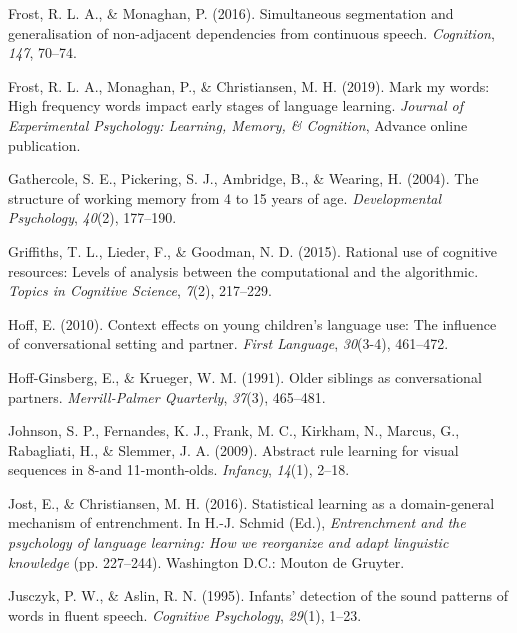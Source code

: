 \documentclass[
  english,
  man,mask,floatsintext]{apa6}
\begin{document}
\leavevmode\hypertarget{ref-frost2016simultaneous}{}%
Frost, R. L. A., \& Monaghan, P. (2016). Simultaneous segmentation and generalisation of non-adjacent dependencies from continuous speech. \emph{Cognition}, \emph{147}, 70--74.

\leavevmode\hypertarget{ref-frost2019}{}%
Frost, R. L. A., Monaghan, P., \& Christiansen, M. H. (2019). Mark my words: High frequency words impact early stages of language learning. \emph{Journal of Experimental Psychology: Learning, Memory, \& Cognition}, Advance online publication.

\leavevmode\hypertarget{ref-gathercole2004structure}{}%
Gathercole, S. E., Pickering, S. J., Ambridge, B., \& Wearing, H. (2004). The structure of working memory from 4 to 15 years of age. \emph{Developmental Psychology}, \emph{40}(2), 177--190.

\leavevmode\hypertarget{ref-griffiths2015rational}{}%
Griffiths, T. L., Lieder, F., \& Goodman, N. D. (2015). Rational use of cognitive resources: Levels of analysis between the computational and the algorithmic. \emph{Topics in Cognitive Science}, \emph{7}(2), 217--229.

\leavevmode\hypertarget{ref-hoff2010context}{}%
Hoff, E. (2010). Context effects on young children's language use: The influence of conversational setting and partner. \emph{First Language}, \emph{30}(3-4), 461--472.

\leavevmode\hypertarget{ref-hoff1991older}{}%
Hoff-Ginsberg, E., \& Krueger, W. M. (1991). Older siblings as conversational partners. \emph{Merrill-Palmer Quarterly}, \emph{37}(3), 465--481.

\leavevmode\hypertarget{ref-johnson2009abstract}{}%
Johnson, S. P., Fernandes, K. J., Frank, M. C., Kirkham, N., Marcus, G., Rabagliati, H., \& Slemmer, J. A. (2009). Abstract rule learning for visual sequences in 8-and 11-month-olds. \emph{Infancy}, \emph{14}(1), 2--18.

\leavevmode\hypertarget{ref-jost201610}{}%
Jost, E., \& Christiansen, M. H. (2016). Statistical learning as a domain-general mechanism of entrenchment. In H.-J. Schmid (Ed.), \emph{Entrenchment and the psychology of language learning: How we reorganize and adapt linguistic knowledge} (pp. 227--244). Washington D.C.: Mouton de Gruyter.

\leavevmode\hypertarget{ref-jusczyk1995infants}{}%
Jusczyk, P. W., \& Aslin, R. N. (1995). Infants' detection of the sound patterns of words in fluent speech. \emph{Cognitive Psychology}, \emph{29}(1), 1--23.
\end{document}
